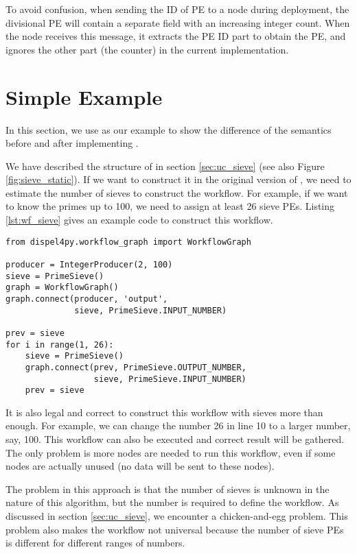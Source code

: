 To avoid confusion, when sending the ID of PE to a node during deployment, the divisional PE will contain a separate field with an increasing integer count. When the node receives this message, it extracts the PE ID part to obtain the PE, and ignores the other part (\ie the counter) in the current implementation.

\section{Simple Example} \label{sec:dynexp_example}
In this section, we use \ttsieve as our example to show the difference of the semantics before and after implementing \tdynexp.

We have described the structure of \ttsieve in section \ref{sec:uc_sieve} (see also Figure \ref{fig:sieve_static}). If we want to construct it in the original version of \dpy, we need to estimate the number of sieves to construct the workflow. For example, if we want to know the primes up to 100, we need to assign at least 26 sieve PEs. Listing \ref{lst:wf_sieve} gives an example code to construct this workflow.

\begin{lstlisting}[frame=single,caption={Example code of the sieve workflow construction in the old semantics (suppose IntegerProducer and PrimeSieve are already defined},captionpos=b,label={lst:wf_sieve}]
from dispel4py.workflow_graph import WorkflowGraph

producer = IntegerProducer(2, 100)
sieve = PrimeSieve()
graph = WorkflowGraph()
graph.connect(producer, 'output',
              sieve, PrimeSieve.INPUT_NUMBER)

prev = sieve
for i in range(1, 26):
    sieve = PrimeSieve()
    graph.connect(prev, PrimeSieve.OUTPUT_NUMBER,
                  sieve, PrimeSieve.INPUT_NUMBER)
    prev = sieve
\end{lstlisting}

It is also legal and correct to construct this workflow with sieves more than enough. For example, we can change the number 26 in line 10 to a larger number, say, 100. This workflow can also be executed and correct result will be gathered. The only problem is more nodes are needed to run this workflow, even if some nodes are actually unused (\ie no data will be sent to these nodes).

The problem in this approach is that the number of sieves is unknown in the nature of this algorithm, but the number is required to define the workflow. As discussed in section \ref{sec:uc_sieve}, we encounter a chicken-and-egg problem. This problem also makes the workflow not universal because the number of sieve PEs is different for different ranges of numbers.

